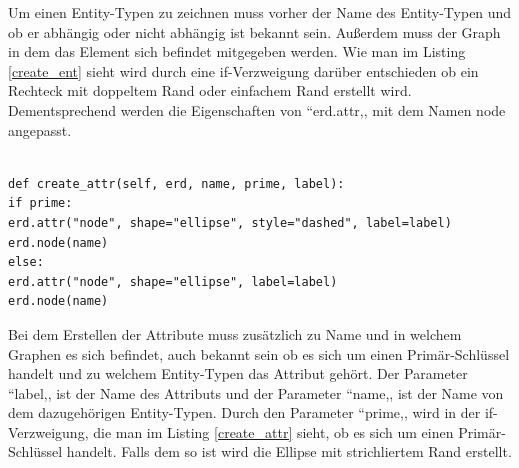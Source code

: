 Um einen Entity-Typen zu zeichnen muss vorher der Name des Entity-Typen und ob er abhängig oder nicht abhängig ist bekannt sein. Außerdem muss der Graph in dem das Element sich befindet mitgegeben werden. Wie man im Listing \ref{create_ent} sieht wird durch eine if-Verzweigung darüber entschieden ob ein Rechteck mit doppeltem Rand oder einfachem Rand erstellt wird. Dementsprechend werden die Eigenschaften von ``erd.attr,, mit dem Namen node angepasst.
\newpage
\fib{}
\noindent
\lstset{language=Python}
\lstset{frame=lines}
\lstset{basicstyle=\footnotesize}
\begin{lstlisting}

def create_attr(self, erd, name, prime, label):
if prime:
erd.attr("node", shape="ellipse", style="dashed", label=label)
erd.node(name)
else:
erd.attr("node", shape="ellipse", label=label)
erd.node(name)

\end{lstlisting}
\noindent
Bei dem Erstellen der Attribute muss zusätzlich zu Name und in welchem Graphen es sich befindet, auch bekannt sein ob es sich um einen Primär-Schlüssel handelt und zu welchem Entity-Typen das Attribut gehört. Der Parameter ``label,, ist der Name des Attributs und der Parameter ``name,, ist der Name von dem dazugehörigen Entity-Typen. Durch den Parameter ``prime,, wird in der if-Verzweigung, die man im Listing \ref{create_attr} sieht, ob es sich um einen Primär-Schlüssel handelt. Falls dem so ist wird die Ellipse mit strichliertem Rand erstellt.

